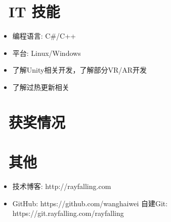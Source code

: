 \documentclass{resume}
\begin{document}
\section{\faCogs\ IT 技能}
\begin{itemize}[parsep=0.5ex]
  \item 编程语言: C\#/C++
  \item 平台: Linux/Windows
  \item 了解Unity相关开发，了解部分VR/AR开发
  \item 了解过热更新相关
\end{itemize}

\section{\faHeartO\ 获奖情况}

\section{\faInfo\ 其他}
\begin{itemize}[parsep=0.5ex]
  \item 技术博客: http://rayfalling.com
  \item GitHub: https://github.com/wanghaiwei 自建Git: https://git.rayfalling.com/rayfalling
\end{itemize}

%
%
\end{document}
